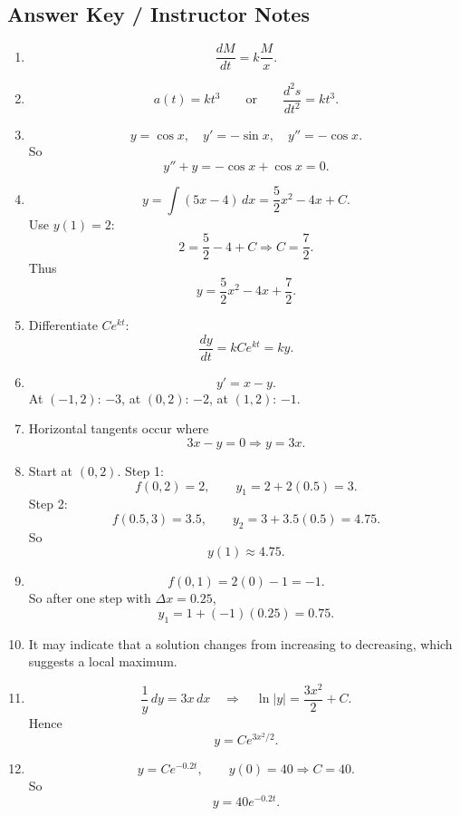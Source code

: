 \documentclass[11pt]{article}
\begin{document}
\subsection{Answer Key / Instructor Notes}

\begin{enumerate}
    \item
    \[
    \frac{dM}{dt}=k\frac{M}{x}.
    \]

    \item
    \[
    a(t)=kt^3
    \qquad\text{or}\qquad
    \frac{d^2s}{dt^2}=kt^3.
    \]

    \item
    \[
    y=\cos x,\quad y'=-\sin x,\quad y''=-\cos x.
    \]
    So
    \[
    y''+y=-\cos x+\cos x=0.
    \]

    \item
    \[
    y=\int(5x-4)\,dx=\frac52x^2-4x+C.
    \]
    Use \(y(1)=2\):
    \[
    2=\frac52-4+C \Rightarrow C=\frac72.
    \]
    Thus
    \[
    y=\frac52x^2-4x+\frac72.
    \]

    \item Differentiate \(Ce^{kt}\):
    \[
    \frac{dy}{dt}=kCe^{kt}=ky.
    \]

    \item
    \[
    y'=x-y.
    \]
    At \((-1,2)\): \(-3\), at \((0,2)\): \(-2\), at \((1,2)\): \(-1\).

    \item Horizontal tangents occur where
    \[
    3x-y=0 \Rightarrow y=3x.
    \]

    \item Start at \((0,2)\).  
    Step 1:
    \[
    f(0,2)=2,\qquad y_1=2+2(0.5)=3.
    \]
    Step 2:
    \[
    f(0.5,3)=3.5,\qquad y_2=3+3.5(0.5)=4.75.
    \]
    So
    \[
    y(1)\approx 4.75.
    \]

    \item
    \[
    f(0,1)=2(0)-1=-1.
    \]
    So after one step with \(\Delta x=0.25\),
    \[
    y_1=1+(-1)(0.25)=0.75.
    \]

    \item It may indicate that a solution changes from increasing to decreasing, which suggests a local maximum.

    \item
    \[
    \frac{1}{y}\,dy=3x\,dx
    \quad\Rightarrow\quad
    \ln|y|=\frac{3x^2}{2}+C.
    \]
    Hence
    \[
    y=Ce^{3x^2/2}.
    \]

    \item
    \[
    y=Ce^{-0.2t},\qquad y(0)=40 \Rightarrow C=40.
    \]
    So
    \[
    y=40e^{-0.2t}.
    \]


\end{enumerate}
\end{document}
